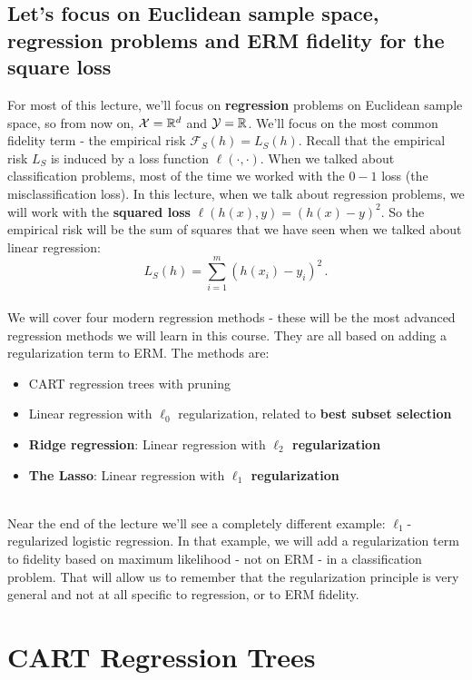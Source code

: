 \documentclass[11pt]{article}
\newcommand{\R}{\ensuremath{\mathbb{R}}}
\newcommand{\Fc}{\mathcal{F}}
\begin{document}
    \subsection{Let's focus on Euclidean sample space, regression problems and
    ERM fidelity for the square loss}

    For most of this lecture, we'll focus on {\bf regression} problems on
    Euclidean sample space, so from now on, $\X=\R^d$ and
    $\Y=\R$. We'll focus on the most common fidelity term - the empirical risk
    $\Fc_S(h) = L_S(h)$. 
    Recall that the empirical risk $L_S$ is induced by a loss function
    $\ell(\cdot,\cdot)$. 
    When we talked about classification problems, most of the time we worked
    with the $0-1$ loss (the misclassification loss). In this lecture, when we
    talk about regression problems, we will work with the {\bf squared loss}
    $\ell(h(x),y)=(h(x)-y)^2$. So the empirical risk will be the sum of squares
    that we have seen when we talked about linear regression:
    \[
      L_S(h)= \sum_{i=1}^m \left( h(x_i)-y_i \right)^2\,.
    \]
~\\
    We will cover four modern regression methods - these will be the most advanced
    regression methods we will learn in this course. They are all based on
    adding a regularization term to ERM. The methods are:

    \begin{itemize}
  \item CART regression trees with pruning
  \item Linear regression with $\ell_0$ regularization, related to {\bf best subset selection}
  \item {\bf Ridge regression}: Linear regression with {\bf $\ell_2$ regularization}
  \item {\bf The Lasso}: Linear regression with {\bf $\ell_1$ regularization}
 \end{itemize}
~\\
    Near the end of the lecture we'll see a completely different example:
    $\ell_1$-regularized logistic regression. In that example, we will
    add a regularization term to fidelity based on  maximum likelihood  - not
    on ERM - in a classification problem. That will allow us to remember that
    the regularization principle is very general and not at all specific to
    regression, or to ERM fidelity. 

    \section{CART Regression Trees}
\end{document}
